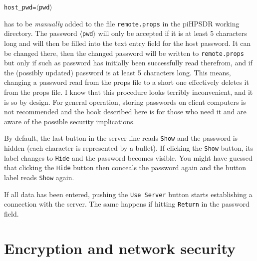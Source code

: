 \documentclass[12pt]{book}
\def\rett#1{\texttt{\color{red}#1}}
\def\pH{pi\-HPSDR\xspace}
\begin{document}
\texttt{host\_pwd=}$\langle$\texttt{pwd}$\rangle$

has to be \textit{manually} added to the file \texttt{remote.props} in the \pH working directory. The
password $\langle$\texttt{pwd}$\rangle$ will only be accepted if it is at least 5 characters long
and will then be filled into the text entry field for the host password. It can be changed there,
then the changed password will be written to \texttt{remote.props} but only if such as password
has initially been successfully read therefrom, and if the (possibly updated) password is at least
5 characters long. This means, changing a password read from the props file to a short one effectively
deletes it from the props file. I know that this procedure looks terribly inconvenient, and it is so
by design. For general operation, storing passwords on client computers is not recommended and the
hook described here is for those who need it and are aware of the possible security implications.

By default, the last button in
the server line reads \rett{Show} and the password is hidden (each character is represented by a bullet).
If clicking the \rett{Show} button, its label changes to \rett{Hide} and the password becomes visible. You
might have guessed that clicking the \rett{Hide} button then conceals the password again and the button
label reads \rett{Show} again.

If all data has been entered, pushing the \rett{Use Server} button starts establishing a connection
with the server. The same happens if hitting \texttt{Return} in the password field.

\section{Encryption and network security}
\end{document}
